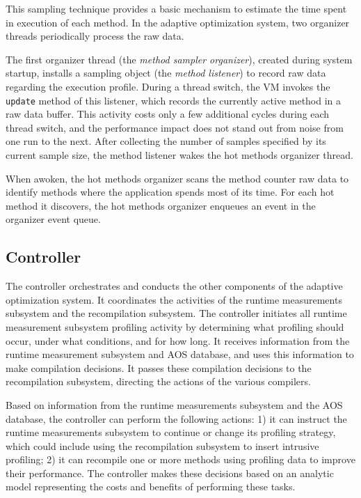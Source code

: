 This sampling technique provides a basic mechanism to estimate the
time spent in execution of each method.  In the adaptive optimization
system, two organizer threads periodically process the raw data.

The first organizer thread (the {\em method sampler organizer}), created
during system startup, installs a sampling object (the {\em method
listener}) to record raw data regarding the execution profile.
During a thread switch, the
VM invokes the {\tt update} method of this listener, which records the
currently active method in a raw data buffer. 
This activity costs only a few
additional cycles during each thread switch, and the performance
impact does not stand out from noise from one run to the next.
After collecting the number of samples specified by its current sample
size, the method listener wakes the hot methods organizer thread. 

When awoken, the hot methods organizer scans the method counter raw data to
identify methods where the application spends most of its time. 
For each hot method it
discovers, the hot methods organizer enqueues an event
in the organizer event queue.

\subsection{Controller}\label{sec:arch:control}
The controller orchestrates and conducts the other components of 
the adaptive optimization system.
It coordinates the activities of the runtime measurements subsystem
and the recompilation subsystem.
The controller initiates all runtime measurement subsystem profiling 
activity by determining what profiling should occur, under what conditions,
and for how long.
It receives information from the runtime measurement subsystem and AOS
database, and uses this information to make compilation decisions.
It passes these compilation decisions to the recompilation subsystem,
directing the actions of the various compilers.

Based on information from the runtime measurements subsystem and the 
AOS database, the controller can perform the following actions: 
1) it can instruct the runtime measurements subsystem to
continue or change its profiling strategy, which could include using
the recompilation subsystem to insert intrusive profiling; 2) it can
recompile one or more methods using profiling data to improve their
performance.  The controller makes these decisions based on an
analytic model representing the costs and benefits of performing these
tasks.

